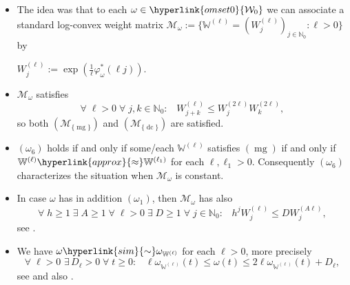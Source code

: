 \documentclass[11pt,a4paper]{article}
\theoremstyle{plain}
\theoremstyle{definition}
\newcommand{\NN}{\mathbb{N}}
\newcommand{\W}{\mathbb{W}}
\let\on=\operatorname
\begin{document}
\begin{itemize}
	\item[$(i)$] The idea was that to each $\omega\in\hyperlink{omset0}{\mathcal{W}_0}$ we can associate a standard log-convex weight matrix $\mathcal{M}_{\omega}:=\{\W^{(\ell)}=(W^{(\ell)}_j)_{j\in\NN_0}: \ell>0\}$ by\vspace{6pt}
	
	 \centerline{$W^{(\ell)}_j:=\exp\left(\frac{1}{\ell}\varphi^{*}_{\omega}(\ell j)\right)$.}\vspace{6pt}
	
	
	\item[$(ii)$] $\mathcal{M}_{\omega}$ satisfies
	\begin{equation}\label{newmoderategrowth}
		 \forall\;\ell>0\;\forall\;j,k\in\NN_0:\;\;\;W^{(\ell)}_{j+k}\le W^{(2\ell)}_jW^{(2\ell)}_k,
	\end{equation}
	so both \hyperlink{R-mg}{$(\mathcal{M}_{\{\on{mg}\}})$} and \hyperlink{R-dc}{$(\mathcal{M}_{\{\on{dc}\}})$} are satisfied.
	
	\item[$(iii)$] \hyperlink{om6}{$(\omega_6)$} holds if and only if some/each $\W^{(\ell)}$ satisfies \hyperlink{mg}{$(\on{mg})$} if and only if $\W^{(\ell)}\hyperlink{approx}{\approx}\W^{(\ell_1)}$ for each $\ell,\ell_1>0$. Consequently \hyperlink{om6}{$(\omega_6)$} characterizes the situation when $\mathcal{M}_{\omega}$ is constant.
	
	\item[$(iv)$] In case $\omega$ has in addition \hyperlink{om1}{$(\omega_1)$}, then $\mathcal{M}_{\omega}$ has also
	\begin{equation}\label{newexpabsorb}
		\forall\;h\ge 1\;\exists\;A\ge 1\;\forall\;\ell>0\;\exists\;D\ge 1\;\forall\;j\in\NN_0:\;\;\;h^jW^{(\ell)}_j\le D W^{(A\ell)}_j,
	\end{equation}
see \cite[Lemma 5.9 (5.10)]{compositionpaper}.
	
	\item[$(v)$] We have $\omega\hyperlink{sim}{\sim}\omega_{\W^{(\ell)}}$ for each $\ell>0$, more precisely
	\begin{equation}\label{goodequivalenceclassic}
		\forall\;\ell>0\,\,\exists\,D_{\ell}>0\;\forall\;t\ge 0:\;\;\;\ell\omega_{\W^{(\ell)}}(t)\le\omega(t)\le 2\ell\omega_{\W^{(\ell)}}(t)+D_{\ell},
	\end{equation}
	see \cite[Thm. 4.0.3, Lemma 5.1.3]{dissertation} and also \cite[Lemma 2.5]{sectorialextensions}.
	

\end{itemize}
\end{document}

